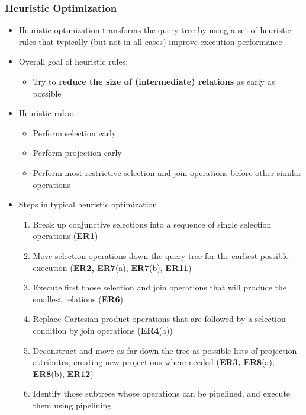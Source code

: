 \subsubsection{Heuristic Optimization}
\begin{itemize}[label=\(\rhd\)]
    \item Heuristic optimization transforms the query-tree by using a set of heuristic rules that typically (but not in all cases) improve execution performance
    \item Overall goal of heuristic rules:
    \begin{itemize}[label=\(\rhd\)]
        \item Try to \textbf{reduce the size of (intermediate) relations} as early as possible
    \end{itemize}
    \item Heuristic rules:
    \begin{itemize}[label=\(\rhd\)]
        \item Perform selection early
        \item Perform projection early
        \item Perform most restrictive selection and join operations before other similar operations
    \end{itemize}
    \item Steps in typical heuristic optimization
    \begin{enumerate}
        \item Break up conjunctive selections into a sequence of single selection operations (\textbf{ER1})
        \item Move selection operations down the query tree for the earliest possible execution (\textbf{ER2, ER7}(a), \textbf{ER7}(b), \textbf{ER11})
        \item Execute first those selection and join operations that will produce the smallest relations (\textbf{ER6})
        \item Replace Cartesian product operations that are followed by a selection condition by join operations (\textbf{ER4}(a))
        \item Deconstruct and move as far down the tree as possible lists of projection attributes, creating new projections where needed (\textbf{ER3, ER8}(a), \textbf{ER8}(b), \textbf{ER12})
        \item Identify those subtrees whose operations can be pipelined, and execute them using pipelining
    \end{enumerate}
\end{itemize}

